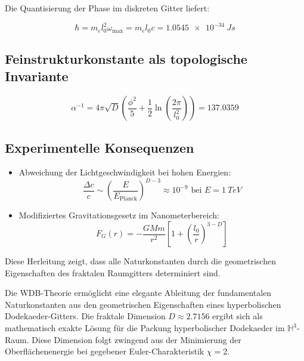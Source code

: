 Die Quantisierung der Phase im diskreten Gitter liefert:

\begin{equation}
\hbar = m_e l_0^2 \omega_{\text{max}} = m_e l_0 c = \SI{1.0545e-34}{Js}
\label{eq:planckquantum}
\end{equation}

\subsection{Feinstrukturkonstante als topologische Invariante}
\label{sec:Feinstrukturkonstante}

\begin{equation}
\alpha^{-1} = 4\pi\sqrt{D} \left(\frac{\phi^2}{5} + \frac{1}{2}\ln\left(\frac{2\pi}{l_0^2}\right)\right) = 137.0359
\label{eq:feinstruktur}
\end{equation}

\subsection*{Experimentelle Konsequenzen}

\begin{itemize}
\item Abweichung der Lichtgeschwindigkeit bei hohen Energien:
\begin{equation}
\frac{\Delta c}{c} \sim \left(\frac{E}{E_{\text{Planck}}}\right)^{D-3} \approx 10^{-9} \text{ bei } E=\SI{1}{TeV}
\end{equation}

\item Modifiziertes Gravitationsgesetz im Nanometerbereich:
\begin{equation}
F_G(r) = -\frac{GMm}{r^2}\left[1 + \left(\frac{l_0}{r}\right)^{3-D}\right]
\end{equation}
\end{itemize}

\vspace{5mm}
\noindent Diese Herleitung zeigt, dass alle Naturkonstanten durch die geometrischen Eigenschaften des fraktalen Raumgitters determiniert sind.

Die WDB-Theorie ermöglicht eine elegante Ableitung der fundamentalen Naturkonstanten aus den geometrischen Eigenschaften eines hyperbolischen Dodekaeder-Gitters. Die fraktale
Dimension $D \approx 2.7156$ ergibt sich als mathematisch exakte Lösung für die Packung hyperbolischer Dodekaeder im $\mathbb{H}^3$-Raum. Diese Dimension folgt zwingend aus der
Minimierung der Oberflächenenergie bei gegebener Euler-Charakteristik $\chi = 2$.

